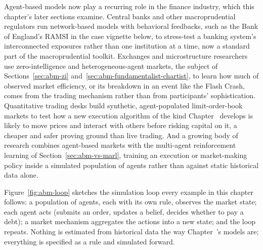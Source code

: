 \documentclass[../ai_in_finance]{subfiles}
\begin{document}
Agent-based models now play a recurring role in the finance industry, which this chapter's later sections examine. Central banks and other macroprudential regulators run network-based models with behavioral feedbacks, such as the Bank of England's RAMSI in the case vignette below, to stress-test a banking system's interconnected exposures rather than one institution at a time, now a standard part of the macroprudential toolkit. Exchanges and microstructure researchers use zero-intelligence and heterogeneous-agent markets, the subject of Sections~\ref{sec:abm-zi} and~\ref{sec:abm-fundamentalist-chartist}, to learn how much of observed market efficiency, or its breakdown in an event like the Flash Crash, comes from the trading mechanism rather than from participants' sophistication. Quantitative trading desks build synthetic, agent-populated limit-order-book markets to test how a new execution algorithm of the kind Chapter~ develops is likely to move prices and interact with others before risking capital on it, a cheaper and safer proving ground than live trading. And a growing body of research combines agent-based markets with the multi-agent reinforcement learning of Section~\ref{sec:abm-vs-marl}, training an execution or market-making policy inside a simulated population of agents rather than against static historical data alone.

Figure~\ref{fig:abm-loop} sketches the simulation loop every example in this chapter follows: a population of agents, each with its own rule, observes the market state; each agent acts (submits an order, updates a belief, decides whether to pay a debt); a market mechanism aggregates the actions into a new state; and the loop repeats. Nothing is estimated from historical data the way Chapter~'s models are; everything is specified as a rule and simulated forward.
\end{document}

